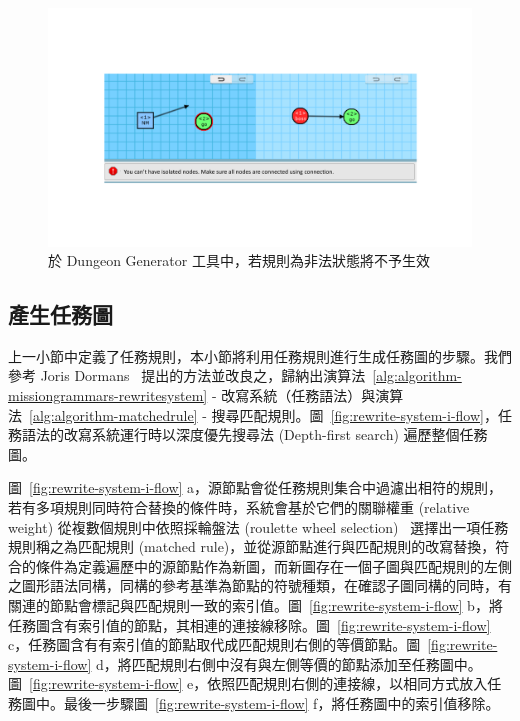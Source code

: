 \begin{figure}[!htb]
  \begin{center}
    \includegraphics[width=1.0\textwidth]{figures/missiongrammars-illegal-rules.pdf}
    \caption{於 Dungeon Generator 工具中，若規則為非法狀態將不予生效}
    \label{fig:missiongrammars-illegal-rules}
  \end{center}
\end{figure}

\subsection{產生任務圖}
\label{ssec:method-missiongrammars-graph}

上一小節中定義了任務規則，本小節將利用任務規則進行生成任務圖的步驟。我們參考 Joris Dormans~\cite{dormans2010adventures} 提出的方法並改良之，歸納出演算法~\ref{alg:algorithm-missiongrammars-rewritesystem} - 改寫系統（任務語法）與演算法~\ref{alg:algorithm-matchedrule} - 搜尋匹配規則。圖~\ref{fig:rewrite-system-i-flow}，任務語法的改寫系統運行時以深度優先搜尋法 (Depth-first search) 遍歷整個任務圖。

圖~\ref{fig:rewrite-system-i-flow} a，源節點會從任務規則集合中過濾出相符的規則，若有多項規則同時符合替換的條件時，系統會基於它們的關聯權重 (relative weight) 從複數個規則中依照採輪盤法 (roulette wheel selection)~\cite{lipowski2012roulette} 選擇出一項任務規則稱之為匹配規則 (matched rule)，並從源節點進行與匹配規則的改寫替換，符合的條件為定義遍歷中的源節點作為新圖，而新圖存在一個子圖與匹配規則的左側之圖形語法同構，同構的參考基準為節點的符號種類，在確認子圖同構的同時，有關連的節點會標記與匹配規則一致的索引值。圖~\ref{fig:rewrite-system-i-flow} b，將任務圖含有索引值的節點，其相連的連接線移除。圖~\ref{fig:rewrite-system-i-flow} c，任務圖含有有索引值的節點取代成匹配規則右側的等價節點。圖~\ref{fig:rewrite-system-i-flow} d，將匹配規則右側中沒有與左側等價的節點添加至任務圖中。圖~\ref{fig:rewrite-system-i-flow} e，依照匹配規則右側的連接線，以相同方式放入任務圖中。最後一步驟圖~\ref{fig:rewrite-system-i-flow} f，將任務圖中的索引值移除。

